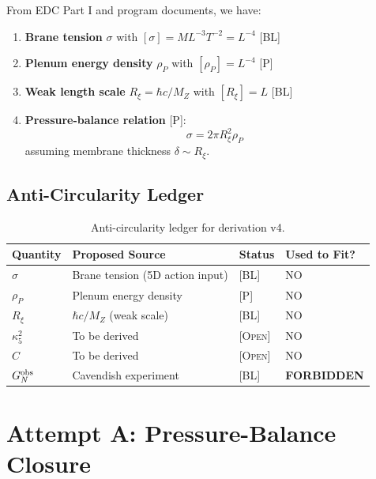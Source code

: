 \documentclass[11pt,a4paper]{article}
\theoremstyle{definition}
\newcommand{\BL}{\textsc{[BL]}}
\newcommand{\Post}{\textsc{[P]}}
\newcommand{\Open}{\textsc{[Open]}}
\begin{document}
From EDC Part I and program documents, we have:

\begin{enumerate}
\item \textbf{Brane tension} $\sigma$ with $[\sigma] = M L^{-3} T^{-2} = L^{-4}$ \hfill \BL
\item \textbf{Plenum energy density} $\rho_P$ with $[\rho_P] = L^{-4}$ \hfill \Post
\item \textbf{Weak length scale} $R_\xi = \hbar c / M_Z$ with $[R_\xi] = L$ \hfill \BL
\item \textbf{Pressure-balance relation} \Post:
\begin{equation}
\sigma = 2\pi R_\xi^2 \rho_P
\label{eq:pressure_balance}
\end{equation}
assuming membrane thickness $\delta \sim R_\xi$.
\end{enumerate}

\subsection{Anti-Circularity Ledger}

\begin{table}[h]
\centering
\begin{tabular}{llll}
\toprule
\textbf{Quantity} & \textbf{Proposed Source} & \textbf{Status} & \textbf{Used to Fit?} \\
\midrule
$\sigma$ & Brane tension (5D action input) & \BL & NO \\
$\rho_P$ & Plenum energy density & \Post & NO \\
$R_\xi$ & $\hbar c / M_Z$ (weak scale) & \BL & NO \\
$\kappa_5^2$ & To be derived & \Open & NO \\
$C$ & To be derived & \Open & NO \\
$G_N^{\rm obs}$ & Cavendish experiment & \BL & \textbf{FORBIDDEN} \\
\bottomrule
\end{tabular}
\caption{Anti-circularity ledger for derivation v4.}
\label{tab:ledger}
\end{table}

\section{Attempt A: Pressure-Balance Closure}
\label{sec:attempt_a}
\end{document}
